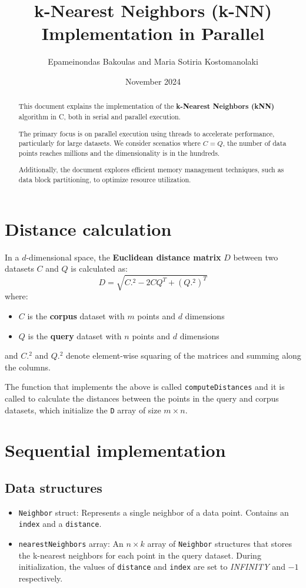 \documentclass{article}
\title{k-Nearest Neighbors (k-NN) Implementation in Parallel}
\author{Epameinondas Bakoulas and Maria Sotiria Kostomanolaki}
\date{November 2024}
\begin{document}
\maketitle

\begin{abstract}
    This document explains the implementation of the \textbf{k-Nearest Neighbors (kNN)} algorithm in C, both in serial and parallel execution.
    
    The primary focus is on parallel execution using threads to accelerate performance, particularly for large datasets. We consider scenatios 
    where $C=Q$, the number of data points reaches millions and the dimensionality is in the hundreds. 

    Additionally, the document explores efficient memory management techniques, such as data block partitioning, to optimize resource utilization.
\end{abstract}

\section{Distance calculation}
In a $d$-dimensional space, the \textbf{Euclidean distance matrix} $D$ between two datasets 
$C$ and $Q$ is calculated as: 
\[
D = \sqrt{C.^2 - 2 C Q^T + (Q.^2)^T}
\]
where:
\begin{itemize}
    \item $C$ is the \textbf{corpus} dataset with $m$ points and $d$ dimensions
    \item $Q$ is the \textbf{query} dataset with $n$ points and $d$ dimensions
\end{itemize}
and $C.^2$ and $Q.^2$ denote element-wise squaring of the matrices and summing along the columns.

The function that implements the above is called \texttt{computeDistances} and it is called to calculate the
distances between the points in the query and corpus datasets, which initialize the \texttt{D} array of size $m \times n$.


\section{Sequential implementation}

\subsection{Data structures} 

\begin{itemize}
    \item \texttt{Neighbor} struct: Represents a single neighbor of a data point. Contains an \texttt{index} and a \texttt{distance}.
    \item \texttt{nearestNeighbors} array: An $n \times k$ array of \texttt{Neighbor} structures that stores the k-nearest neighbors for each point in the query dataset. During initialization, 
    the values of \texttt{distance} and \texttt{index} are set to \emph{INFINITY} and $-1$ respectively.
\end{itemize}
\end{document}
